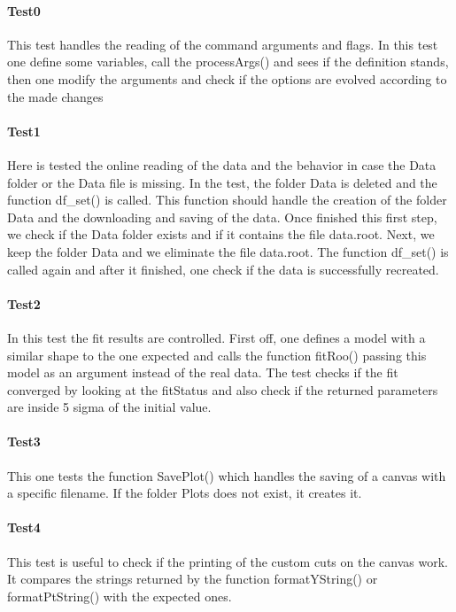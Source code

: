 \documentclass{article}
\begin{document}
\paragraph{Test0} This test handles the reading of the command arguments and flags. In this test one define some variables, call the processArgs() and sees if the definition stands, then one modify the arguments and check if the options are evolved according to the made changes

\paragraph{Test1} Here is tested the online reading of the data and the behavior in case the Data folder or the Data file is missing. In the test, the folder Data is deleted and the function df\_set() is called. This function should handle the creation of the folder Data and the downloading and saving of the data. Once finished this first step, we check if the Data folder exists and if it contains the file data.root. Next, we keep the folder Data and we eliminate the file data.root. The function df\_set() is called again and after it finished, one check if the data is successfully recreated.

\paragraph{Test2}In this test the fit results are controlled. First off, one defines a model with a similar shape to the one expected and calls the function fitRoo() passing this model as an argument instead of the real data. The test checks if the fit converged by looking at the fitStatus and also check if the returned parameters are inside 5 sigma of the initial value.

\paragraph{Test3} This one tests the function SavePlot() which handles the saving of a canvas with a specific filename. If the folder Plots does not exist, it creates it.

\paragraph{Test4} This test is useful to check if the printing of the custom cuts on the canvas work. It compares the strings returned by the function formatYString() or formatPtString() with the expected ones.
\end{document}
